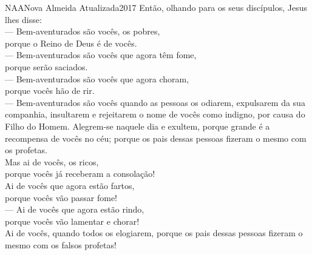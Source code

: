 \begin{traducao}{NAA}{Nova Almeida Atualizada}{2017}
Então, olhando para os seus discípulos, Jesus lhes disse:\\
— Bem-aventurados são vocês, os pobres,\\
\quad porque o Reino de Deus é de vocês.\\
— Bem-aventurados são vocês que agora têm fome,\\
\quad porque serão saciados.\\
— Bem-aventurados são vocês que agora choram,\\
\quad porque vocês hão de rir.\\
— Bem-aventurados são vocês quando as pessoas os odiarem, expulsarem da
sua companhia, insultarem e rejeitarem o nome de vocês como indigno, por causa
do Filho do Homem. Alegrem-se naquele dia e exultem, porque grande é a
recompensa de vocês no céu; porque os pais dessas pessoas fizeram o mesmo com
os profetas.\\
Mas ai de vocês, os ricos,\\
\quad porque vocês já receberam a consolação!\\
Ai de vocês que agora estão fartos,\\
\quad porque vocês vão passar fome!\\
— Ai de vocês que agora estão rindo,\\
\quad porque vocês vão lamentar e chorar!\\
Ai de vocês, quando todos os elogiarem, porque os pais dessas pessoas
fizeram o mesmo com os falsos profetas!
\end{traducao}

